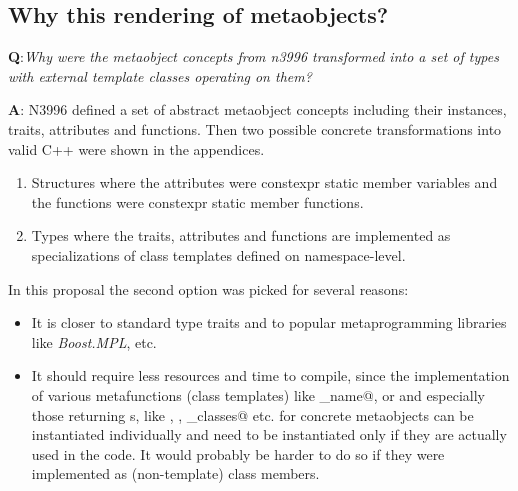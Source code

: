 \subsection{Why this rendering of metaobjects?}

{\textbf Q:}{\em Why were the metaobject concepts from n3996 transformed into a set
of types with external template classes operating on them?
}

{\textbf A:} N3996 defined a set of abstract metaobject concepts including their
instances, traits, attributes and functions.
Then two possible concrete transformations into valid C++ were shown in the appendices.

\begin{enumerate}
\item Structures where the attributes were constexpr static member variables and the functions were
constexpr static member functions.
\item Types where the traits, attributes and functions are implemented as specializations of
class templates defined on namespace-level.
\end{enumerate}

In this proposal the second option was picked for several reasons:

\begin{itemize}
\item It is closer to standard type traits and to popular metaprogramming libraries like {\em Boost.MPL}, etc.
\item It should require less resources and time to compile, since the implementation of various
metafunctions (class templates) like \verb@base_name@, \verb@scope@ or \verb@position@ and
especially those returning s, like \verb@members@, \verb@overloads@,
\verb@base_classes@ etc. for concrete metaobjects can be instantiated individually
and need to be instantiated only if they are actually used in the code. It would probably be harder
to do so if they were implemented as (non-template) class members.
\end{itemize}



